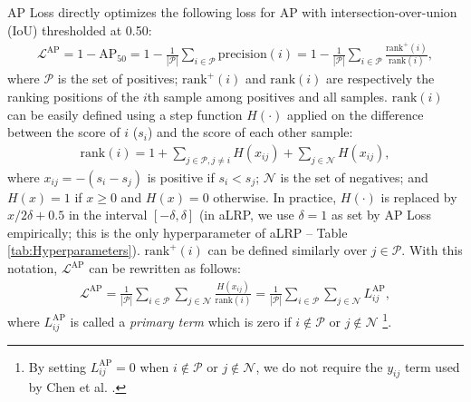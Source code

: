\documentclass{article}
\begin{document}
AP Loss \cite{APLoss} directly optimizes the following loss for AP with intersection-over-union (IoU) thresholded at 0.50:
\begin{align}
    \label{eq:APLoss}
    \mathcal{L}^{\mathrm{AP}} = 1- \mathrm{\mathrm{AP}}_{50} = 1 - \frac{1}{|\mathcal{P}|} \sum \limits_{i \in \mathcal{P}} \mathrm{precision}(i) 
    = 
    1 - \frac{1}{|\mathcal{P}|} \sum \limits_{i \in \mathcal{P}} \frac{\mathrm{rank}^+(i)}{\mathrm{rank}(i)},
\end{align}
where $\mathcal{P}$ is the set of positives; $\mathrm{rank}^+(i)$ and $\mathrm{rank}(i)$ are respectively the ranking positions of the $i$th sample among positives and all samples. $\mathrm{rank}(i)$ can be easily defined using a step function $H(\cdot)$ applied on the  difference between the score of $i$ ($s_i$) and the score of each other sample:
\begin{align}
\mathrm{rank}(i) =  
1+\sum \limits_{j \in \mathcal{P}, j \neq i} H(x_{ij})+\sum \limits_{j \in  \mathcal{N}} H(x_{ij}),
\end{align}
where $x_{ij} = -(s_i-s_j)$ is positive if $s_i<s_j$; $\mathcal{N}$ is the set of negatives; and $H(x)=1$ if $x \geq 0$ and $H(x)=0$ otherwise. In practice, $H(\cdot)$ is replaced by $x / 2 \delta+0.5$ in the interval $[-\delta,\delta]$ (in aLRP, we use $\delta=1$ as set by AP Loss \cite{APLoss} empirically; this is the only hyperparameter of aLRP -- Table \ref{tab:Hyperparameters}). $\mathrm{rank}^+(i)$ can be defined similarly over $j\in\mathcal{P}$. With this notation, $\mathcal{L}^{\mathrm{AP}}$ can  be rewritten as follows:
\begin{align}
    \label{eq:APPrimaryTerms}
    \mathcal{L}^{\mathrm{AP}} = \frac{1}{|\mathcal{P}|} \sum \limits_{i \in \mathcal{P}} \sum \limits_{j \in \mathcal{N}}  \frac{H(x_{ij})} {\mathrm{rank}(i)}
    =
    \frac{1}{|\mathcal{P}|} \sum \limits_{i \in \mathcal{P}} \sum \limits_{j \in \mathcal{N}}  L_{ij}^{\mathrm{AP}} ,
\end{align}
where  $L_{ij}^{\mathrm{AP}}$ is called a \textit{primary term} which is zero if $i \notin \mathcal{P}$ or $j \notin \mathcal{N}$
\footnote{By setting $L_{ij}^{\mathrm{AP}}=0$ when $i \notin \mathcal{P}$ or $j \notin \mathcal{N}$, we do not require the $y_{ij}$ term used by Chen et al. \cite{APLoss}.}.
\end{document}
